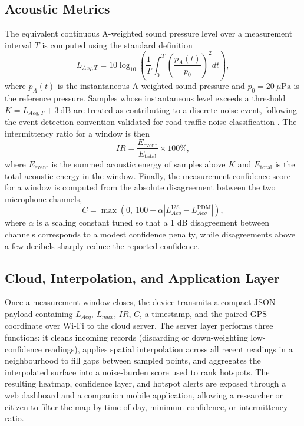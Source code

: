 \documentclass[conference]{IEEEtran}
\begin{document}
\subsection{Acoustic Metrics}
The equivalent continuous A-weighted sound pressure level over a measurement interval $T$ is computed using the standard definition
\begin{equation}
L_{Aeq,T} = 10\log_{10}\left(\frac{1}{T}\int_{0}^{T}\left(\frac{p_A(t)}{p_0}\right)^{2}dt\right),
\label{eq:laeq}
\end{equation}
where $p_A(t)$ is the instantaneous A-weighted sound pressure and $p_0 = 20\ \mu\text{Pa}$ is the reference pressure. Samples whose instantaneous level exceeds a threshold $K = L_{Aeq,T} + 3\ \text{dB}$ are treated as contributing to a discrete noise event, following the event-detection convention validated for road-traffic noise classification \cite{b3}. The intermittency ratio for a window is then
\begin{equation}
IR = \frac{E_{\text{event}}}{E_{\text{total}}}\times 100\%,
\label{eq:ir}
\end{equation}
where $E_{\text{event}}$ is the summed acoustic energy of samples above $K$ and $E_{\text{total}}$ is the total acoustic energy in the window. Finally, the measurement-confidence score for a window is computed from the absolute disagreement between the two microphone channels,
\begin{equation}
C = \max\left(0,\ 100 - \alpha\left|L_{Aeq}^{\text{I2S}} - L_{Aeq}^{\text{PDM}}\right|\right),
\label{eq:conf}
\end{equation}
where $\alpha$ is a scaling constant tuned so that a 1 dB disagreement between channels corresponds to a modest confidence penalty, while disagreements above a few decibels sharply reduce the reported confidence.

\subsection{Cloud, Interpolation, and Application Layer}
Once a measurement window closes, the device transmits a compact JSON payload containing $L_{Aeq}$, $L_{max}$, $IR$, $C$, a timestamp, and the paired GPS coordinate over Wi-Fi to the cloud server. The server layer performs three functions: it cleans incoming records (discarding or down-weighting low-confidence readings), applies spatial interpolation across all recent readings in a neighbourhood to fill gaps between sampled points, and aggregates the interpolated surface into a noise-burden score used to rank hotspots. The resulting heatmap, confidence layer, and hotspot alerts are exposed through a web dashboard and a companion mobile application, allowing a researcher or citizen to filter the map by time of day, minimum confidence, or intermittency ratio.
\end{document}
